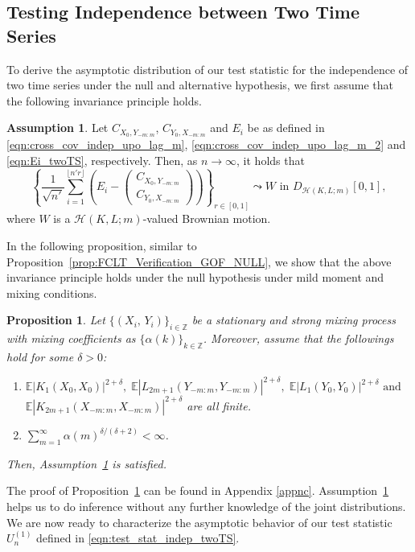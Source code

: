 \documentclass[11pt]{article}
\newcommand{\bE}{\mathbb{E}}
\theoremstyle{plain}
\newtheorem{proposition}{Proposition}
\theoremstyle{definition}
\newtheorem{assumption}{Assumption}
\theoremstyle{remark}
\begin{document}
\subsection{Testing Independence between Two Time Series}\label{sec:theory_indep_twoTS}
To derive the asymptotic distribution of our test statistic for the independence of two time series under the null and alternative hypothesis, we first assume that the following invariance principle holds.
\begin{assumption}\label{ass:FCLT_cross_cov_indep_upto_lag_m}
Let $C_{X_0,Y_{-m:m}}$, $C_{Y_0,X_{-m:m}}$ and $E_i$ be as defined in \eqref{eqn:cross_cov_indep_upo_lag_m}, \eqref{eqn:cross_cov_indep_upo_lag_m_2} and \eqref{eqn:Ei_twoTS}, respectively. Then, as $n\to \infty$, it holds that
  $$\left\{\frac{1}{\sqrt{n'}}\sum_{i=1}^{\lfloor n'r\rfloor}\left(E_i-\begin{pmatrix}
    C_{X_0,Y_{-m:m}}\\
    C_{Y_0,X_{-m:m}}
\end{pmatrix}\right)\right\}_{r \in [0,1]}\leadsto W \text{ in } D_{\mathcal{H}(K,L;m)}[0,1],$$
        where $W$ is a $\mathcal{H}(K,L;m)$-valued Brownian motion.
\end{assumption}
In the following proposition, similar to Proposition~\ref{prop:FCLT_Verification_GOF_NULL}, we show that the above invariance principle holds under the null hypothesis under mild moment and mixing conditions.
\begin{proposition}\label{prop:FCLT_cross_cov_indep_upto_lag_m_Verify}
    Let $\{(X_i,\,Y_{i})\}_{i\in \mathbb{Z}}$ be a stationary and strong mixing process with mixing coefficients as $\{\alpha(k)\}_{k\in \mathbb{Z}}$. Moreover, assume that the followings hold for some $\delta>0$:
\begin{enumerate}
    \item $\bE |K_1(X_0,X_0)|^{2+\delta},\;\bE |L_{2m+1}(Y_{-m:m},Y_{-m:m})|^{2+\delta},\; \bE |L_1(Y_0,Y_0)|^{2+\delta} \text{ and }$\\
    $\bE |K_{2m+1}(X_{-m:m},X_{-m:m})|^{2+\delta} $ are all finite.
    \item$\sum_{m=1}^{\infty} \alpha(m)^{\delta /(\delta+2)}<\infty$.
\end{enumerate}
Then, Assumption~\ref{ass:FCLT_cross_cov_indep_upto_lag_m} is satisfied.
\end{proposition}
\noindent The proof of Proposition~\ref{prop:FCLT_cross_cov_indep_upto_lag_m_Verify} can be found in Appendix \ref{appnc}. Assumption~\ref{ass:FCLT_cross_cov_indep_upto_lag_m} helps us to do inference without any further knowledge of the joint distributions. We are now ready to characterize the asymptotic behavior of our test statistic $U^{(1)}_n$ defined in \eqref{eqn:test_stat_indep_twoTS}.
\end{document}
